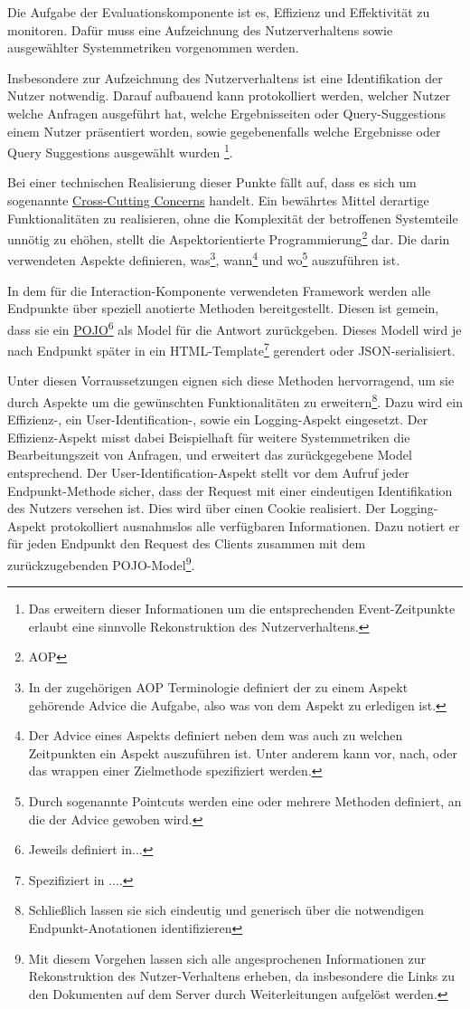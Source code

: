 Die Aufgabe der Evaluationskomponente ist es, Effizienz und Effektivität zu monitoren.
Dafür muss eine Aufzeichnung des Nutzerverhaltens sowie ausgewählter Systemmetriken vorgenommen werden.

Insbesondere zur Aufzeichnung des Nutzerverhaltens ist eine Identifikation der Nutzer notwendig.
Darauf aufbauend kann protokolliert werden, welcher Nutzer welche Anfragen ausgeführt
hat, welche Ergebnisseiten oder Query-Suggestions einem Nutzer präsentiert worden,
sowie gegebenenfalls welche Ergebnisse oder Query Suggestions ausgewählt wurden
\footnote{Das erweitern dieser Informationen um die entsprechenden Event-Zeitpunkte erlaubt eine
sinnvolle Rekonstruktion des Nutzerverhaltens.}.

Bei einer technischen Realisierung dieser Punkte fällt auf,
dass es sich um sogenannte \href{https://de.wikipedia.org/wiki/Cross-Cutting_Concern}{Cross-Cutting Concerns}
handelt. Ein bewährtes Mittel derartige Funktionalitäten zu realisieren, ohne die
Komplexität der betroffenen Systemteile unnötig zu ehöhen, stellt die Aspektorientierte Programmierung\footnote{AOP} dar\cite{}.
Die darin verwendeten Aspekte definieren,
was\footnote{In der zugehörigen AOP Terminologie definiert der zu einem Aspekt gehörende Advice die Aufgabe,
also was von dem Aspekt zu erledigen ist.\cite{}}, wann\footnote{Der Advice eines Aspekts definiert 
neben dem was auch zu welchen Zeitpunkten ein Aspekt auszuführen ist.
Unter anderem kann vor, nach, oder das wrappen einer Zielmethode spezifiziert werden\cite{}.}
und wo\footnote{Durch sogenannte Pointcuts werden eine oder mehrere Methoden definiert,
an die der Advice gewoben wird\cite{}.} auszuführen ist\cite{}.

In dem für die Interaction-Komponente verwendeten Framework werden alle Endpunkte über speziell anotierte Methoden
bereitgestellt.
Diesen ist gemein, dass sie ein \href{https://de.wikipedia.org/wiki/Plain_Old_Java_Object}{POJO}\footnote{Jeweils definiert in...}
als Model für die Antwort zurückgeben. 
Dieses Modell wird je nach Endpunkt später in ein HTML-Template\footnote{Spezifiziert in ....} gerendert oder
JSON-serialisiert.

Unter diesen Vorraussetzungen eignen sich diese Methoden hervorragend,
um sie durch Aspekte um die gewünschten Funktionalitäten zu erweitern\footnote{Schließlich lassen
sie sich eindeutig und generisch über die notwendigen Endpunkt-Anotationen
identifizieren}.
Dazu wird ein Effizienz-, ein User-Identification-, sowie ein Logging-Aspekt eingesetzt.
Der Effizienz-Aspekt misst dabei Beispielhaft für weitere Systemmetriken die Bearbeitungszeit von Anfragen,
und erweitert das zurückgegebene Model entsprechend.
Der User-Identification-Aspekt stellt
vor dem Aufruf jeder Endpunkt-Methode sicher, dass der Request mit einer
eindeutigen Identifikation des Nutzers versehen ist.
Dies wird über einen Cookie realisiert.
Der Logging-Aspekt protokolliert ausnahmslos alle verfügbaren Informationen.
Dazu notiert er für jeden Endpunkt den Request des Clients zusammen mit dem zurückzugebenden
POJO-Model\footnote{Mit diesem Vorgehen lassen sich alle angesprochenen Informationen zur Rekonstruktion des Nutzer-Verhaltens erheben,
da insbesondere die Links zu den Dokumenten auf dem Server durch Weiterleitungen aufgelöst werden.}.

